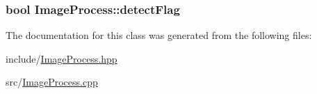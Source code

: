 \subsubsection[{\texorpdfstring{detect\+Flag}{detectFlag}}]{\setlength{\rightskip}{0pt plus 5cm}bool Image\+Process\+::detect\+Flag}\hypertarget{classImageProcess_a265b78fb51ab67a89743dd9c3f85e69b}{}\label{classImageProcess_a265b78fb51ab67a89743dd9c3f85e69b}


The documentation for this class was generated from the following files\+:\begin{DoxyCompactItemize}
\item 
include/\hyperlink{ImageProcess_8hpp}{Image\+Process.\+hpp}\item 
src/\hyperlink{ImageProcess_8cpp}{Image\+Process.\+cpp}\end{DoxyCompactItemize}
